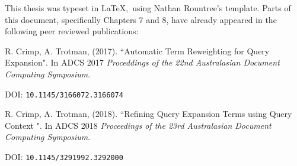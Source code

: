 This thesis was typeset in \LaTeX,~using Nathan Rountree's template. Parts of this document, specifically Chapters 7 and 8, have already appeared in the following peer reviewed publications:

\noindent
R. Crimp, A. Trotman, (2017). ``Automatic Term Reweighting for Query Expansion". In ADCS 2017 \textit{Proceddings of the 22nd Australasian Document Computing Symposium}. 

DOI: \texttt{10.1145/3166072.3166074}

\noindent
R. Crimp, A. Trotman, (2018). ``Refining Query Expansion Terms using Query Context
". In ADCS 2018 \textit{Proceedings of the 23rd Australasian Document Computing Symposium}. 

DOI: \texttt{10.1145/3291992.3292000}